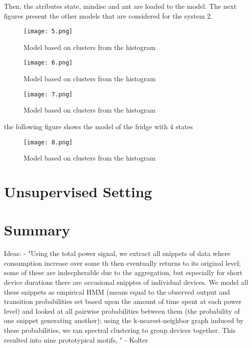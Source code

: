 Then, the atributes state, mindisc and ant are loaded to the model. The next figures present the other models that are considered for the system 2. 
\begin{figure}[tb]
    \centering
    \texttt{[image: 5.png]}
    \caption{Model based on clusters from the histogram}
    \label{ch35}
\end{figure}


\begin{figure}[tb]
    \centering
    \texttt{[image: 6.png]}
    \caption{Model based on clusters from the histogram}
    \label{ch36}
\end{figure}


\begin{figure}[tb]
    \centering
    \texttt{[image: 7.png]}
    \caption{Model based on clusters from the histogram}
    \label{ch37}
\end{figure}

the following figure shows the model of the fridge with 4 states

\begin{figure}[tb]
    \centering
    \texttt{[image: 8.png]}
    \caption{Model based on clusters from the histogram}
    \label{ch37}
\end{figure}

\section{Unsupervised Setting}


\section{Summary}

Ideas:
- "Using the total power signal, we extract all snippets of data where consumption increase over some th then eventually returns to its original level; some of these are indecpherable due to the aggregation, but especially for short device durations there are occasional snipptes of individual devices. We model all these snippets as empirical HMM (means equal to the observed output and transition probabilities set based upon the amount of time spent at each power level) and looked at all pairwise probabilities between them (the probability of one snippet generating another); using the k-nearest-neighbor graph induced by these probabilities, we ran spectral clustering to group devices together. This resulted into nine prototypical motifs, " - Kolter